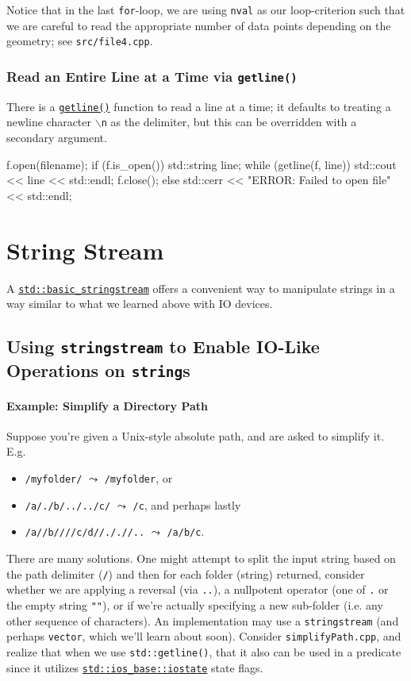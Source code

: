 \documentclass[12pt,letterpaper,twoside]{article}
\begin{document}
Notice that in the last \texttt{for}-loop, we are using \texttt{nval} as 
our loop-criterion such that we are careful to read the appropriate number of data points
depending on the geometry; see \texttt{src/file4.cpp}.

\subsubsection{Read an Entire Line at a Time via \texttt{getline()}}
There is a \href{https://en.cppreference.com/w/cpp/string/basic_string/getline}{\texttt{getline()}} function to read a line at a time; it defaults to treating a newline character 
\texttt{$\backslash$n} as the delimiter, but this can be overridden with a secondary argument.
\begin{cpp}
f.open(filename);
if (f.is_open()) {
  std::string line;
  while (getline(f, line))
    std::cout << line << std::endl;
  f.close();
}
else {
  std::cerr << "ERROR: Failed to open file" << std::endl;
}
\end{cpp}

\section{String Stream}
A \href{https://en.cppreference.com/w/cpp/io/basic_stringstream}
{\texttt{std::basic\_stringstream}} offers a convenient way to manipulate strings in a way similar to what we learned above with IO devices.

\subsection{Using \texttt{stringstream} to Enable IO-Like Operations on \texttt{string}s}
\paragraph{Example: Simplify a Directory Path} Suppose you're given a Unix-style absolute path, and are asked to simplify it. E.g. 
\begin{itemize} 
  \item \texttt{/myfolder/} $\leadsto$ \texttt{/myfolder}, or
  \item \texttt{/a/./b/../../c/} $\leadsto$ \texttt{/c}, and perhaps lastly 
  \item \texttt{/a//b////c/d//././/..} $\leadsto$ \texttt{/a/b/c}.   
\end{itemize}

There are many solutions. One might attempt to split the input string 
based on the path delimiter (\texttt{/}) and then for each 
folder (string) returned, consider whether we are applying a 
reversal (via \texttt{..}), a nullpotent operator (one of \texttt{.} or the empty string  \texttt{""}), or 
if we're actually specifying a new sub-folder (i.e. any other sequence of characters). An implementation may use a \texttt{stringstream} (and perhaps 
\texttt{vector}, which we'll learn about soon). Consider \texttt{simplifyPath.cpp},
and realize that when we use \texttt{std::getline()}, that it also can be used in a predicate
since it utilizes 
\href{https://en.cppreference.com/w/cpp/io/ios_base/iostate}{\texttt{std::ios\_base::iostate}} 
state flags.
\end{document}
